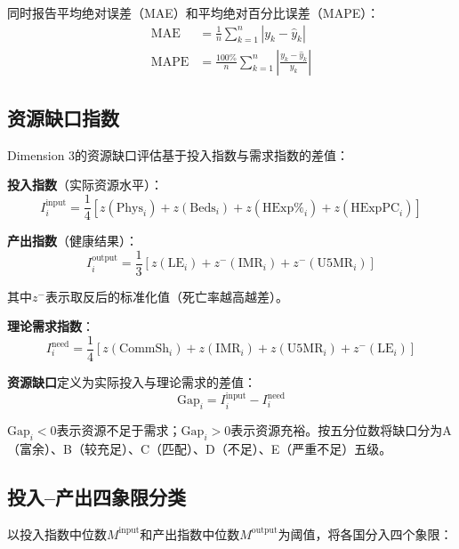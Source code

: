 \documentclass[12pt,a4paper]{ctexart}
\begin{document}
同时报告平均绝对误差（MAE）和平均绝对百分比误差（MAPE）：
\begin{align}
    \text{MAE} &= \frac{1}{n}\sum_{k=1}^{n}|y_k - \hat{y}_k| \\
    \text{MAPE} &= \frac{100\%}{n}\sum_{k=1}^{n}\left|\frac{y_k - \hat{y}_k}{y_k}\right|
\end{align}

\subsection{资源缺口指数}

Dimension 3的资源缺口评估基于投入指数与需求指数的差值：

\textbf{投入指数}（实际资源水平）：
\begin{equation}
    I_i^{\text{input}} = \frac{1}{4}\left[z(\text{Phys}_i) + z(\text{Beds}_i) + z(\text{HExp\%}_i) + z(\text{HExpPC}_i)\right]
\end{equation}

\textbf{产出指数}（健康结果）：
\begin{equation}
    I_i^{\text{output}} = \frac{1}{3}\left[z(\text{LE}_i) + z^{-}(\text{IMR}_i) + z^{-}(\text{U5MR}_i)\right]
\end{equation}

其中$z^{-}$表示取反后的标准化值（死亡率越高越差）。

\textbf{理论需求指数}：
\begin{equation}
    I_i^{\text{need}} = \frac{1}{4}\left[z(\text{CommSh}_i) + z(\text{IMR}_i) + z(\text{U5MR}_i) + z^{-}(\text{LE}_i)\right]
\end{equation}

\textbf{资源缺口}定义为实际投入与理论需求的差值：
\begin{equation}
    \text{Gap}_i = I_i^{\text{input}} - I_i^{\text{need}}
\end{equation}

$\text{Gap}_i < 0$表示资源不足于需求；$\text{Gap}_i > 0$表示资源充裕。按五分位数将缺口分为A（富余）、B（较充足）、C（匹配）、D（不足）、E（严重不足）五级。

\subsection{投入--产出四象限分类}

以投入指数中位数$M^{\text{input}}$和产出指数中位数$M^{\text{output}}$为阈值，将各国分入四个象限：
\end{document}
